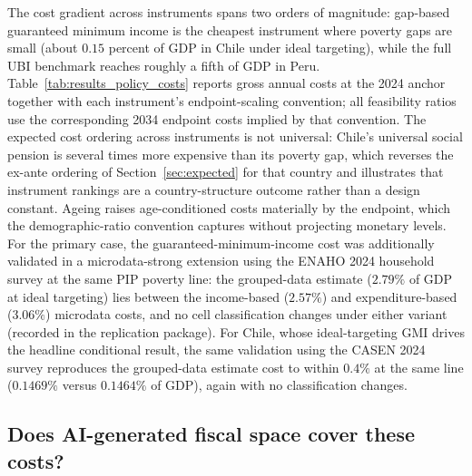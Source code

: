 \documentclass[11pt,a4paper]{article}
\begin{document}
The cost gradient across instruments spans two orders of magnitude: gap-based guaranteed
minimum income is the cheapest instrument where poverty gaps are small (about $0.15$ percent
of GDP in Chile under ideal targeting), while the full UBI benchmark reaches roughly a fifth
of GDP in Peru. Table~\ref{tab:results_policy_costs} reports gross annual costs at the 2024 anchor together with each instrument's endpoint-scaling convention; all feasibility ratios use the corresponding 2034 endpoint costs implied by that convention. The expected cost ordering across
instruments is not universal: Chile's universal social pension is several times more
expensive than its poverty gap, which reverses the ex-ante ordering of
Section~\ref{sec:expected} for that country and illustrates that instrument rankings are a
country-structure outcome rather than a design constant. Ageing raises age-conditioned
costs materially by the endpoint, which the demographic-ratio convention captures without
projecting monetary levels. For the primary case, the guaranteed-minimum-income cost was
additionally validated in a microdata-strong extension using the ENAHO 2024 household survey
at the same PIP poverty line: the grouped-data estimate ($2.79\%$ of GDP at ideal
targeting) lies between the income-based ($2.57\%$) and expenditure-based ($3.06\%$)
microdata costs, and no cell classification changes under either variant (recorded in the
replication package). For Chile, whose ideal-targeting GMI drives the headline conditional
result, the same validation using the CASEN 2024 survey reproduces the grouped-data estimate
cost to within $0.4\%$ at the same line ($0.1469\%$ versus $0.1464\%$ of GDP), again with no
classification changes.



\subsection{Does AI-generated fiscal space cover these costs?}\label{subsec:results_baseline}
\end{document}
